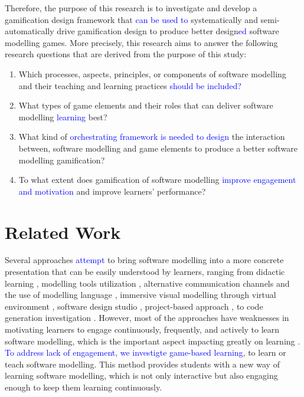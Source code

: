 \documentclass[runningheads,a4paper]{llncs}
\begin{document}
Therefore, the purpose of this research is to investigate and develop a gamification design framework that \textcolor{blue}{can be used to }systematically and semi-automatically drive gamification design to produce better design\textcolor{blue}{ed} software modelling games. More precisely, this research aims to answer the following research questions that are derived from the purpose of this study:
\begin{enumerate}
\item Which processes, aspects, principles, or components of software modelling and their teaching and learning practices \textcolor{blue}{should be included?}
\item What types of game elements and their roles that can deliver software modelling \textcolor{blue}{learning} best? 
\item What kind of  \textcolor{blue}{orchestrating framework is needed to design} the interaction between, software modelling and game elements to produce a better software modelling gamification?
\item To what extent does gamification of software modelling \textcolor{blue}{improve engagement and motivation} and improve learners’ performance?
\end{enumerate}

\section{Related Work}
Several approaches \textcolor{blue}{attempt} to bring software modelling into a more concrete presentation that can be easily understood by learners, ranging from didactic learning \cite{moisan2009teaching}, modelling tools utilization \cite{Akayama2013}, alternative communication channels and the use of modelling language \cite{Brandsteidl2011}, immersive visual modelling through virtual environment \cite{neubauer2003immersive}, software design studio \cite{Whittle2014}, project-based approach \cite{Szmurlo2007}, to code generation investigation \cite{schmidt2014teaching}. However, most of the approaches have weaknesses in motivating learners to engage continuously, frequently, and actively to learn software modelling, which is the important aspect impacting greatly on learning \cite{Naps2005}. \textcolor{blue}{To address lack of engagement, we investigte game-based learning}, to learn or teach software modelling. This method provides students with a new way of learning software modelling, which is not only interactive but also engaging enough to keep them learning continuously. 
\end{document}
